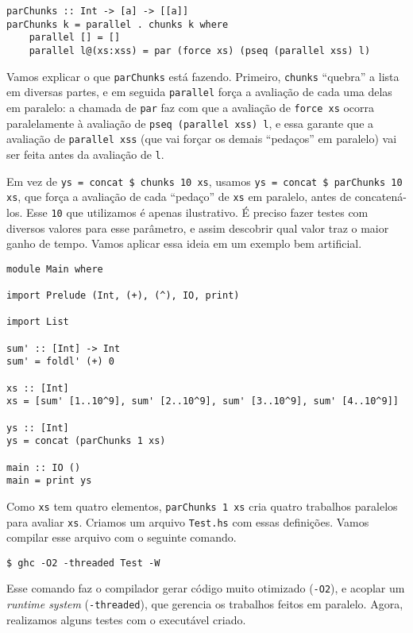 \documentclass[a4paper]{article}
\begin{document}
\begin{verbatim}
parChunks :: Int -> [a] -> [[a]]
parChunks k = parallel . chunks k where
    parallel [] = []
    parallel l@(xs:xss) = par (force xs) (pseq (parallel xss) l)
\end{verbatim}

Vamos explicar o que \texttt{parChunks} está fazendo.
Primeiro, \texttt{chunks} ``quebra'' a lista em diversas partes, e em seguida \texttt{parallel} força a avaliação de cada uma delas em paralelo: a chamada de \texttt{par} faz com que a avaliação de \mbox{\texttt{force xs}} ocorra paralelamente à avaliação de \texttt{pseq (parallel xss) l}, e essa garante que a avaliação de \texttt{parallel xss} (que vai forçar os demais ``pedaços'' em paralelo) vai ser feita antes da avaliação de \texttt{l}.

Em vez de \texttt{ys = concat \$ chunks 10 xs}, usamos \mbox{\texttt{ys = concat \$ parChunks 10 xs}}, que força a avaliação de cada ``pedaço'' de \texttt{xs} em paralelo, antes de concatená-los.
Esse \texttt{10} que utilizamos é apenas ilustrativo.
É preciso fazer testes com diversos valores para esse parâmetro, e assim descobrir qual valor traz o maior ganho de tempo.
Vamos aplicar essa ideia em um exemplo bem artificial.

\begin{verbatim}
module Main where

import Prelude (Int, (+), (^), IO, print)

import List

sum' :: [Int] -> Int
sum' = foldl' (+) 0

xs :: [Int]
xs = [sum' [1..10^9], sum' [2..10^9], sum' [3..10^9], sum' [4..10^9]]

ys :: [Int]
ys = concat (parChunks 1 xs)

main :: IO ()
main = print ys
\end{verbatim}

Como \texttt{xs} tem quatro elementos, \texttt{parChunks 1 xs} cria quatro trabalhos paralelos para avaliar \texttt{xs}.
Criamos um arquivo \texttt{Test.hs} com essas definições.
Vamos compilar esse arquivo com o seguinte comando.

\begin{verbatim}
$ ghc -O2 -threaded Test -W
\end{verbatim}

Esse comando faz o compilador gerar código muito otimizado (\texttt{-O2}), e acoplar um \emph{runtime system} (\texttt{-threaded}), que gerencia os trabalhos feitos em paralelo.
Agora, realizamos alguns testes com o executável criado.
\end{document}
